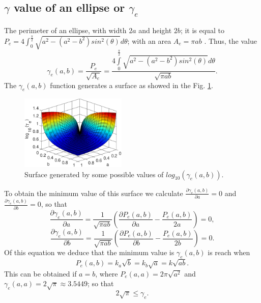 \subsection{$\gamma$ value of an ellipse or $\gamma_e$}
\label{subsec:gammae}
The perimeter of an ellipse, with width $2a$ and height $2b$; 
it is equal to $P_e=4\int_{0}^{\frac{\pi}{2}}{\sqrt{a^2-(a^2-b^2)sin^2(\theta)}d\theta}$; 
 with an area $A_e=\pi ab$ \cite[pp. 702]{larson2010calculus}. Thus, the value
\begin{equation}
\gamma_e(a,b)=\frac{P_e}{\sqrt{A_e}}=\frac{4\int \limits_{0}^{\frac{\pi}{2}}{\sqrt{a^2-(a^2-b^2)sin^2(\theta)}d\theta}}{\sqrt{\pi ab}}.
\end{equation}
The $\gamma_e(a,b)$ function generates a surface as showed in the Fig. \ref{fig:section1-gammae}.
\begin{figure}[h!]
\centering
\includegraphics[width=0.45\textwidth]{section1-gammae.eps}
\caption{Surface generated by some possible values of $log_{10}(\gamma_e(a,b))$.}
\label{fig:section1-gammae}
\end{figure}
To obtain the minimum value of this surface we calculate $\frac{\partial \gamma_e(a,b)}{\partial a}=0$
and $\frac{\partial \gamma_e(a,b)}{\partial b}=0$, so that
\begin{equation}
\frac{\partial \gamma_e(a,b)}{\partial a}=
\frac{1}{\sqrt{\pi ab}}\left( \frac{\partial P_e(a,b)}{\partial a}-\frac{P_e(a,b)}{2 a} \right)=0,
\end{equation}
\begin{equation}
\frac{\partial \gamma_e(a,b)}{\partial b}=
\frac{1}{\sqrt{\pi ab}}\left( \frac{\partial P_e(a,b)}{\partial b}-\frac{P_e(a,b)}{2 b} \right)=0.
\end{equation}
Of this equation we deduce that the minimum value is $\gamma_e(a,b)$ is reach when
\begin{equation}
P_e(a,b)=k_a\sqrt{b}=k_b\sqrt{a}=k\sqrt{a b}.
\end{equation}
This can be obtained if $a=b$, where $P_e(a,a)=2\pi \sqrt{a^2}$
and $\gamma_e(a,a)=2 \sqrt{\pi} \approx 3.5449$; so that
\begin{equation}
2 \sqrt{\pi} \leq \gamma_e.
\end{equation}
